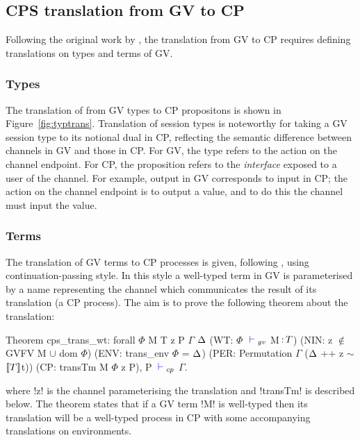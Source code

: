 \subsection{CPS translation from GV to CP}\label{sec:trans}

Following the original work by \citeauthor{Wadler:2014}, the translation from
GV to CP requires defining translations on types and terms of GV.

\subsubsection{Types}



The translation of from GV types to CP propositons is shown in
Figure~\ref{fig:typtrans}. Translation of session types is noteworthy for
taking a GV session type to its notional dual in CP, reflecting the semantic
difference between channels in GV and those in CP. For GV, the type refers to
the action on the channel endpoint. For CP, the proposition refers to the
\textit{interface} exposed to a user of the channel. For example, output in GV
corresponds to input in CP; the action on the channel endpoint is to output a
value, and to do this the channel must input the value.

\subsubsection{Terms}



The translation of GV terms to CP processes is given, following
\citeauthor{Wadler:2014}, using continuation-passing style. In this style a
well-typed term in GV is parameterised by a name representing the channel
which communicates the result of its translation (a CP process). The aim is to
prove the following theorem about the translation:
\begin{coq}
Theorem cps_trans_wt:
  forall $\Phi$ M T z P $\Gamma$ $\Delta$
         (WT: $\Phi$ ${\color{blue} {} \vdash {}}_{gv}$ M$\,{:}\,{T}$)
         (NIN: z $\notin$ GVFV M $\cup$ dom $\Phi$)
         (ENV: trans_env $\Phi$ = $\Delta$)
         (PER: Permutation $\Gamma$ ($\Delta$ ++ z $\sim$ $\llbracket T \rrbracket$t))
         (CP: transTm M $\Phi$ z P),
    P ${\color{blue} {} \vdash {}}_{cp}$ $\Gamma$.
\end{coq}
where \coqe!z! is the channel parameterising the translation and
\coqe!transTm! is described below. The theorem states that if a GV term
\coqe!M! is well-typed then its translation will be a well-typed process in CP
with some accompanying translations on environments.

